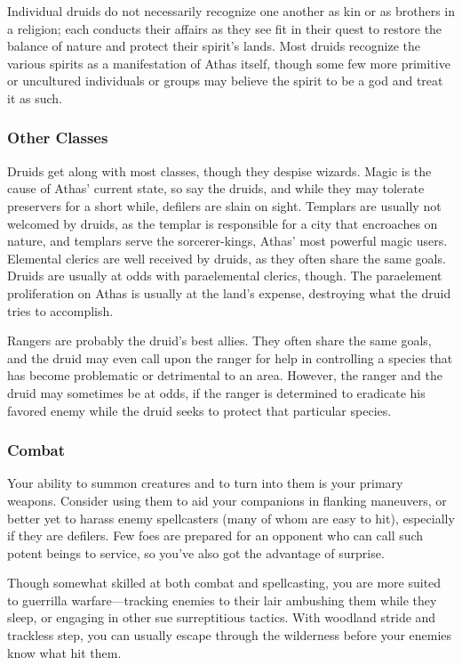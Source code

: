 Individual druids do not necessarily recognize one another as kin or as brothers in a religion; each conducts their affairs as they see fit in their quest to restore the balance of nature and protect their spirit's lands. Most druids recognize the various spirits as a manifestation of Athas itself, though some few more primitive or uncultured individuals or groups may believe the spirit to be a god and treat it as such.

\subsubsection{Other Classes}
Druids get along with most classes, though they despise wizards. Magic is the cause of Athas' current state, so say the druids, and while they may tolerate preservers for a short while, defilers are slain on sight. Templars are usually not welcomed by druids, as the templar is responsible for a city that encroaches on nature, and templars serve the sorcerer-kings, Athas' most powerful magic users. Elemental clerics are well received by druids, as they often share the same goals. Druids are usually at odds with paraelemental clerics, though. The paraelement proliferation on Athas is usually at the land's expense, destroying what the druid tries to accomplish.

Rangers are probably the druid's best allies. They often share the same goals, and the druid may even call upon the ranger for help in controlling a species that has become problematic or detrimental to an area. However, the ranger and the druid may sometimes be at odds, if the ranger is determined to eradicate his favored enemy while the druid seeks to protect that particular species.

\subsubsection{Combat}
Your ability to summon creatures and to turn into them is your primary weapons. Consider using them to aid your companions in flanking maneuvers, or better yet to harass enemy spellcasters (many of whom are easy to hit), especially if they are defilers. Few foes are prepared for an opponent who can call such potent beings to service, so you've also got the advantage of surprise.

Though somewhat skilled at both combat and spellcasting, you are more suited to guerrilla warfare---tracking enemies to their lair ambushing them while they sleep, or engaging in other sue surreptitious tactics. With woodland stride and trackless step, you can usually escape through the wilderness before your enemies know what hit them.

